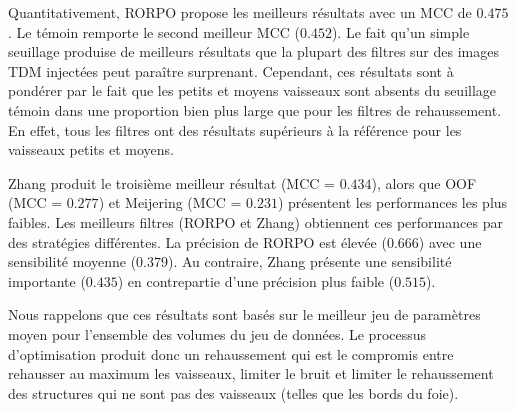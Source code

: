 Quantitativement, RORPO propose les meilleurs résultats avec un MCC de $0.475$. Le témoin remporte le second meilleur MCC ($0.452$). Le fait qu'un simple seuillage produise de meilleurs résultats que la plupart des filtres sur des images TDM injectées peut paraître surprenant. Cependant, ces résultats sont à pondérer par le fait que les petits et moyens vaisseaux sont absents du seuillage témoin dans une proportion bien plus large que pour les filtres de rehaussement. En effet, tous les filtres ont des résultats supérieurs à la référence pour les vaisseaux petits et moyens.  

Zhang produit le troisième meilleur résultat (MCC = $0.434$), alors que OOF (MCC = $0.277$) et Meijering (MCC = $0.231$) présentent les performances les plus faibles. Les meilleurs filtres (RORPO et Zhang) obtiennent ces performances par des stratégies différentes. La précision de RORPO est élevée ($0.666$) avec une sensibilité moyenne ($0.379$). Au contraire, Zhang présente une sensibilité importante ($0.435$) en contrepartie d'une précision plus faible ($0.515$).

Nous rappelons que ces résultats sont basés sur le meilleur jeu de paramètres moyen pour l'ensemble des volumes du jeu de données. Le processus d'optimisation produit donc un rehaussement qui est le compromis entre rehausser au maximum les vaisseaux, limiter le bruit et limiter le rehaussement des structures qui ne sont pas des vaisseaux (telles que les bords du foie). 


